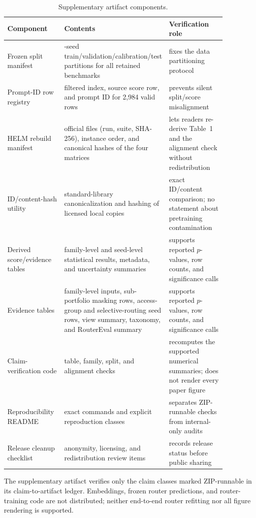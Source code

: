 \documentclass{article}
\begin{document}
\begin{table}[htbp]
  \caption{Supplementary artifact components.}
  \label{tab:app-repro-manifest}
  \centering
  \scriptsize
  \setlength{\tabcolsep}{3pt}
  \begin{tabular}{>{\raggedright\arraybackslash}p{0.27\linewidth} >{\raggedright\arraybackslash}p{0.33\linewidth} >{\raggedright\arraybackslash}p{0.28\linewidth}}
    \toprule
    Component & Contents & Verification role \\
    \midrule
    Frozen split manifest & 30-seed train/validation/calibration/test partitions for all retained benchmarks & fixes the data partitioning protocol \\
    Prompt-ID row registry & filtered index, source score row, and prompt ID for 2,984 valid rows & prevents silent split/score misalignment \\
    HELM rebuild manifest & 264 official files (run, suite, SHA-256), instance order, and canonical hashes of the four matrices & lets readers re-derive Table~1 and the alignment check without redistribution \\
    ID/content-hash utility & standard-library canonicalization and hashing of licensed local copies & exact ID/content comparison; no statement about pretraining contamination \\
    Derived score/evidence tables & family-level and seed-level statistical results, metadata, and uncertainty summaries & supports reported $p$-values, row counts, and significance calls \\
    Evidence tables & family-level inputs, sub-portfolio masking rows, access-group and selective-routing seed rows, view summary, taxonomy, and RouterEval summary & supports reported $p$-values, row counts, and significance calls \\
    Claim-verification code & table, family, split, and alignment checks & recomputes the supported numerical summaries; does not render every paper figure \\
    Reproducibility README & exact commands and explicit reproduction classes & separates ZIP-runnable checks from internal-only audits \\
    Release cleanup checklist & anonymity, licensing, and redistribution review items & records release status before public sharing \\
    \bottomrule
  \end{tabular}
\end{table}

The supplementary artifact verifies only the claim classes marked ZIP-runnable in its claim-to-artifact ledger. Embeddings, frozen router predictions, and router-training code are not distributed; neither end-to-end router refitting nor all figure rendering is supported.
\end{document}
